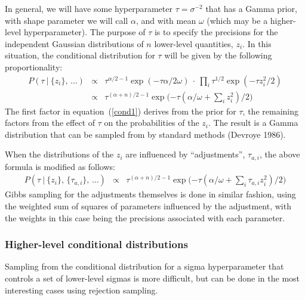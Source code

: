\documentclass{report}[11pt]
\def\beq{\begin{eqnarray}}
\def\eeq{\end{eqnarray}}
\begin{document}
In general, we will have some hyperparameter $\tau=\sigma^{-2}$ that
has a Gamma prior, with shape parameter we will call $\alpha$, and
with mean $\omega$ (which may be a higher-level hyperparameter).  The
purpose of $\tau$ is to specify the precisions for the independent
Gaussian distributions of $n$ lower-level quantities, $z_i$.  In this
situation, the conditional distribution for $\tau$ will be given by the
following proportionality:\beq
  P(\tau\ |\ \{z_i\},\,\ldots) & \propto &
    \tau^{\alpha/2-1} \exp(-\tau\alpha/2\omega) \ \cdot\ 
    \prod_i \tau^{1/2} \exp(-\tau z_i^2/2) \label{cond1}\\[3pt]
  & \propto &
    \tau^{(\alpha+n)/2-1} 
    \exp\big({\textstyle-\tau(\alpha/\omega+\sum\limits_i z_i^2)/2}\big)
\eeq%
The first factor in equation~(\ref{cond1}) derives from the prior for $\tau$, 
the remaining factors from the effect of $\tau$ on the probabilities of the 
$z_i$.  The result is a Gamma distribution that can be sampled from by 
standard methods (Devroye 1986).

When the distributions of the $z_i$ are influenced by ``adjustments'',
$\tau_{a,i}$, the above formula is modified as follows:\beq
  P(\tau\ |\ \{z_i\},\,\{\tau_{a,i}\},\,\ldots) 
  & \propto &
    \tau^{(\alpha+n)/2-1} 
    \exp\big({\textstyle-\tau(\alpha/\omega+\sum\limits_i \tau_{a,i}z_i^2)/2}
    \big)
\eeq%
Gibbs sampling for the adjustments themselves is done in similar fashion,
using the weighted sum of squares of parameters influenced by the adjustment,
with the weights in this case being the precisions associated with each 
parameter.


\subsubsection*{Higher-level conditional distributions}

Sampling from the conditional distribution for a sigma hyperparameter
that controls a set of lower-level sigmas is more difficult, but can
be done in the most interesting cases using rejection sampling.
\end{document}
